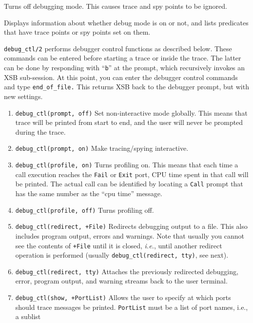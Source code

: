 \begin{description}
    Turns off debugging mode.  This causes trace and spy points to be ignored.

    Displays information about whether debug mode is on or not, and lists
    predicates that have trace points or spy points set on them.

   {\tt debug\_ctl/2} performs debugger control functions as described below.
   These commands can be entered before starting a trace or inside the trace.
   The latter can be done by responding with ``{\tt b}'' at the prompt,
   which recursively invokes an XSB sub-session. At this point, you can
   enter the debugger control commands and type \verb|end_of_file.| This
   returns XSB back to the debugger prompt, but with new settings.
   \begin{enumerate}
   \item {\tt debug\_ctl(prompt, off)} Set non-interactive mode globally.
     This means that trace will be printed from start to end, and the user
     will never be prompted during the trace.
    \item {\tt debug\_ctl(prompt, on)} 
      Make tracing/spying interactive.
    \item {\tt debug\_ctl(profile, on)}  
      Turns profiling on. This means that each time a call execution
      reaches the {\tt Fail} or {\tt Exit} port, CPU time spent in that
      call will be printed. The actual call can be identified by locating a
      {\tt Call}  prompt that has the same number as the ``cpu time''
      message.
    \item {\tt debug\_ctl(profile, off)}  
      Turns profiling off.
    \item {\tt debug\_ctl(redirect, +File)} 
      Redirects debugging output to a file. This also includes program output,
      errors and warnings.
      Note that usually you cannot see the contents of {\tt +File} until it
      is closed, {\it i.e.}, until another redirect operation is performed
      (usually {\tt debug\_ctl(redirect, tty)}, see next).
    \item {\tt debug\_ctl(redirect, tty)}     
      Attaches the previously redirected debugging, error, program output,
      and warning streams back to the user terminal.
    \item {\tt debug\_ctl(show, +PortList)}  
      Allows the user to specify at which ports should trace messages be
      printed. {\tt PortList} must be a list of port names, i.e., a sublist

\end{enumerate}
\end{description}
